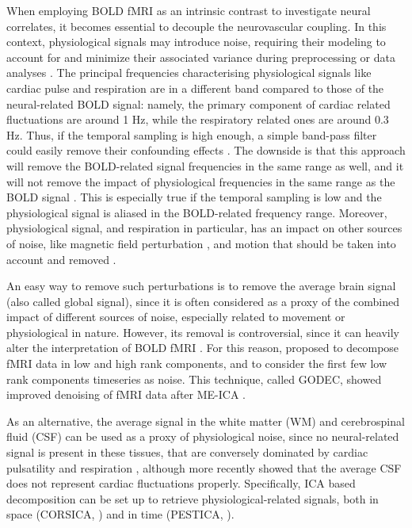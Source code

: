 When employing BOLD fMRI as an intrinsic contrast to investigate neural
correlates, it becomes essential to decouple the neurovascular coupling. In this
context, physiological signals may introduce noise, requiring their modeling to
account for and minimize their associated variance during preprocessing or data
analyses \citep{CaballeroGaudes2017MethodscleaningBOLD,
Liu2016NoisecontributionsfMRI}. The principal frequencies characterising
physiological signals like cardiac pulse and respiration are in a different band
compared to those of the neural-related BOLD signal: namely, the primary
component of cardiac related fluctuations are around 1 Hz, while the respiratory
related ones are around 0.3 Hz. Thus, if the temporal sampling is high enough, a
simple band-pass filter could easily remove their confounding effects
\citep{Biswal1995Functionalconnectivitymotor,Chuang2001IMPACTImagebased,Lowe1998FunctionalConnectivitySingle}.
The downside is that this approach will remove the BOLD-related signal
frequencies in the same range as well, and it will not remove the impact of
physiological frequencies in the same range as the BOLD signal
\citep{CaballeroGaudes2017MethodscleaningBOLD}. This is especially true if the
temporal sampling is low and the physiological signal is aliased in the
BOLD-related frequency range. Moreover, physiological signal, and respiration in
particular, has an impact on other sources of noise, like magnetic field
perturbation \citep{Raj2001Respiratoryeffectshuman}, and motion
\citep{Fair2020Correctionrespiratoryartifacts,PaisRoldan2018IdentifyingRespirationRelated,Power2019Distinctionsrealapparent}
that should be taken into account and removed
\citep{Gratton2020Removalhighfrequency}.

An easy way to remove such perturbations is to remove the average brain signal
(also called global signal), since it is often considered as a proxy of the
combined impact of different sources of noise, especially related to movement or
physiological in nature. However, its removal is controversial, since it can
heavily alter the interpretation of BOLD fMRI
\citep{Power2017Sourcesimplicationswhole}. For this reason,
\cite{Power2018RiddingfMRIdata} proposed to decompose fMRI data in low and high
rank components, and to consider the first few low rank components timeseries as
noise. This technique, called GODEC, showed improved denoising of fMRI data
after ME-ICA \citep{Power2018RiddingfMRIdata,Zhou2011GoDecRandomizedlow}.

As an alternative, the average signal in the white matter (WM) and cerebrospinal
fluid (CSF) can be used as a proxy of physiological noise, since no
neural-related signal is present in these tissues, that are conversely dominated
by cardiac pulsatility and respiration
\citep{Anderson2011Networkanticorrelationsglobal,Jo2010Mappingsourcescorrelation},
although more recently \cite{Attarpour2021Vascularoriginslow} showed that the
average CSF does not represent cardiac fluctuations properly. Specifically, ICA
based decomposition can be set up to retrieve physiological-related signals,
both in space (CORSICA, \cite{Perlbarg2007CORSICAcorrectionstructured}) and in
time (PESTICA, \cite{Beall2007Isolatingphysiologicnoise}).


